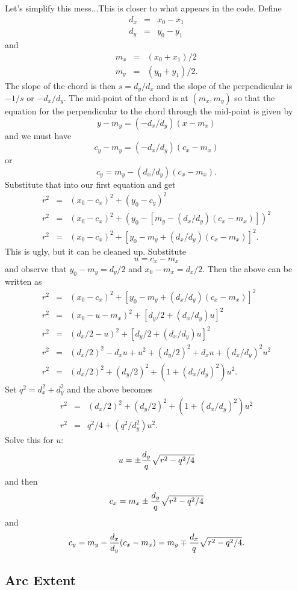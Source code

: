 \documentclass[titlepage,oneside,10pt]{article}
\begin{document}
Let's simplify this mess...This is closer to what appears in the code. Define
\begin{eqnarray*}
  d_x &=& x_0-x_1\\
  d_y &=& y_0-y_1
\end{eqnarray*}
and
\begin{eqnarray*}
  m_x &=& (x_0+x_1)/2\\
  m_y &=& (y_0+y_1)/2.
\end{eqnarray*}
The slope of the chord is then $s = d_y/d_x$ and the slope of the
perpendicular is $-1/s$ or $-d_x/d_y$. The mid-point of the chord is
at $(m_x,m_y)$ so that the equation for the perpendicular to the chord
through the mid-point is given by
$$y - m_y = (-d_x/d_y) (x-m_x)$$
and we must have
$$c_y - m_y = (-d_x/d_y) (c_x-m_x)$$
or
$$c_y = m_y - (d_x/d_y) (c_x-m_x).$$
Substitute that into our first equation and get
\begin{eqnarray*}
  r^2 &=& (x_0-c_x)^2 + (y_0-c_y)^2 \\
  r^2 &=& (x_0-c_x)^2 + \left(y_0-\left[m_y - (d_x/d_y) (c_x-m_x)\right]\right)^2 \\
  r^2 &=& (x_0-c_x)^2 + \left[y_0-m_y + (d_x/d_y) (c_x-m_x)\right]^2.
\end{eqnarray*}
This is ugly, but it can be cleaned up. Substitute
$$u = c_x-m_x$$
and observe that $y_0-m_y = d_y/2$ and $x_0-m_x = d_x/2$. Then the
above can be written as
\begin{eqnarray*}
  r^2 &=& (x_0-c_x)^2 + \left[y_0-m_y + (d_x/d_y) (c_x-m_x)\right]^2 \\
  r^2 &=& (x_0-u-m_x)^2 + \left[d_y/2 + (d_x/d_y) u\right]^2 \\
  r^2 &=& (d_x/2-u)^2 + \left[d_y/2 + (d_x/d_y) u\right]^2 \\
  r^2 &=& (d_x/2)^2 -d_xu +u^2 + (d_y/2)^2 + d_xu + (d_x/d_y)^2 u^2 \\
  r^2 &=& (d_x/2)^2 + (d_y/2)^2  + (1+(d_x/d_y)^2) u^2.
\end{eqnarray*}
Set $q^2= d_x^2+d_y^2$ and the above becomes
\begin{eqnarray*}
  r^2 &=& (d_x/2)^2 + (d_y/2)^2  + (1+(d_x/d_y)^2) u^2 \\
  r^2 &=& q^2/4  + (q^2/d_y^2) u^2.
\end{eqnarray*}
Solve this for $u$:
$$u = \pm{d_y\over q}\sqrt{r^2-q^2/4}$$
and then
$$c_x = m_x \pm{d_y\over q}\sqrt{r^2-q^2/4}$$
and
$$c_y = m_y - {d_x\over d_y}(c_x-m_x) = m_y \mp{d_x\over q}\sqrt{r^2-q^2/4}.$$

\subsection{Arc Extent}
\end{document}
